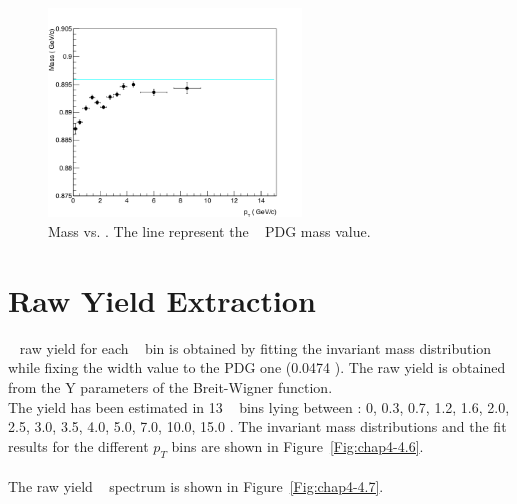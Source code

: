 \begin{figure}[H]
\begin{center}
\includegraphics[width= 0.6\textwidth]{Images/Chapter4/mass.png}
\caption{Mass vs. \pT. The line represent the \kstarZ~ PDG mass value.}
\label{Fig:chap4-4.5}
\end{center}
\end{figure}




\section{Raw Yield Extraction}
\label{par:4.5}
\kzero~ raw yield for each \pT~ bin is obtained by fitting the invariant mass distribution while fixing the width value to the PDG one (0.0474 \GeVcSq). The raw yield is obtained from the Y parameters of the Breit-Wigner function. 
\\
The yield has been estimated in 13 \pT~ bins lying between : 0, 0.3, 0.7, 1.2, 1.6, 2.0, 2.5, 3.0, 3.5, 4.0, 5.0, 7.0, 10.0, 15.0 \GeVc. The invariant mass distributions and the fit results for the different $p_T$ bins are shown in \mbox{Figure \ref{Fig:chap4-4.6}}.
\\
\\
The raw yield \pT~ spectrum is shown in \mbox{Figure \ref{Fig:chap4-4.7}}. 

